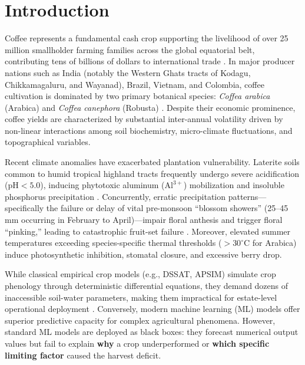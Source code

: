 \documentclass[conference]{IEEEtran}
\begin{document}
\section{Introduction}
Coffee represents a fundamental cash crop supporting the livelihood of over 25 million smallholder farming families across the global equatorial belt, contributing tens of billions of dollars to international trade \cite{ico2023}. In major producer nations such as India (notably the Western Ghats tracts of Kodagu, Chikkamagaluru, and Wayanad), Brazil, Vietnam, and Colombia, coffee cultivation is dominated by two primary botanical species: \textit{Coffea arabica} (Arabica) and \textit{Coffea canephora} (Robusta) \cite{ramalho2013}. Despite their economic prominence, coffee yields are characterized by substantial inter-annual volatility driven by non-linear interactions among soil biochemistry, micro-climate fluctuations, and topographical variables.

Recent climate anomalies have exacerbated plantation vulnerability. Laterite soils common to humid tropical highland tracts frequently undergo severe acidification ($\text{pH} < 5.0$), inducing phytotoxic aluminum ($\text{Al}^{3+}$) mobilization and insoluble phosphorus precipitation \cite{ccri2021}. Concurrently, erratic precipitation patterns---specifically the failure or delay of vital pre-monsoon ``blossom showers'' (25--45 mm occurring in February to April)---impair floral anthesis and trigger floral ``pinking,'' leading to catastrophic fruit-set failure \cite{chemura2020}. Moreover, elevated summer temperatures exceeding species-specific thermal thresholds ($>30^\circ\text{C}$ for Arabica) induce photosynthetic inhibition, stomatal closure, and excessive berry drop.

While classical empirical crop models (e.g., DSSAT, APSIM) simulate crop phenology through deterministic differential equations, they demand dozens of inaccessible soil-water parameters, making them impractical for estate-level operational deployment \cite{boote1996}. Conversely, modern machine learning (ML) models offer superior predictive capacity for complex agricultural phenomena. However, standard ML models are deployed as black boxes: they forecast numerical output values but fail to explain \textbf{why} a crop underperformed or \textbf{which specific limiting factor} caused the harvest deficit.
\end{document}
